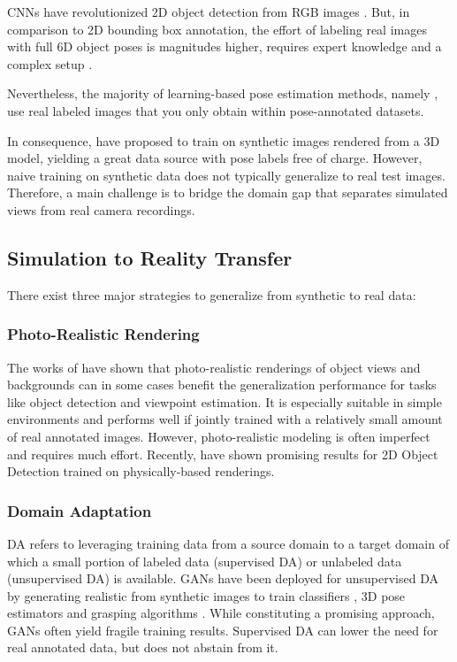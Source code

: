 \glspl{CNN} have revolutionized 2D object detection from RGB images \citep{ren2015faster,liu2016ssd,lin2018focal}. But, in comparison to 2D bounding box annotation, the effort of labeling real images with full 6D object poses is magnitudes higher, requires expert knowledge and a complex setup \citep{hodan2017tless}. 

Nevertheless, the majority of learning-based pose estimation methods, namely \cite{tekin2017real,wohlhart2015learning,brachmann2016uncertainty,rad2017bb8, xiang2017posecnn}, use real labeled images that you only obtain within pose-annotated datasets. 

In consequence, \cite{kehl2017ssd, wohlhart2015learning, tremblay2018deep, zakharov2019dpod} have proposed to train on synthetic images rendered from a 3D model, yielding a great data source with pose labels free of charge. However, naive training on synthetic data does not typically generalize to real test images. Therefore, a main challenge is to bridge the domain gap that separates simulated views from real camera recordings. 

\subsection{Simulation to Reality Transfer}

There exist three major strategies to generalize from synthetic to real data: 

\subsubsection{Photo-Realistic Rendering} The works of \cite{movshovitz2016useful,su2015render,mitash2017self,richter2016playing} have shown that photo-realistic renderings of object views
and backgrounds can in some cases benefit the generalization performance for tasks like object detection and viewpoint estimation. It is especially suitable in simple environments and performs well if jointly trained with a relatively small amount of real annotated images.  However, photo-realistic modeling is often imperfect and requires much effort. Recently, \cite{Hodan2019PhotorealisticIS} have shown promising results for 2D Object Detection trained on physically-based renderings.

\subsubsection{Domain Adaptation} \gls{DA} \citep{csurka2017domain} refers to leveraging training data from a source domain to a target domain of which a small portion of labeled data (supervised \gls{DA}) or unlabeled data (unsupervised \gls{DA}) is available. \glspl{GAN} have been deployed for unsupervised \gls{DA} by generating realistic from synthetic images to train classifiers \citep{shrivastava2017learning}, 3D pose estimators \citep{bousmalis2017unsupervised} and grasping algorithms \citep{bousmalis2017using}. While constituting a promising approach, \glspl{GAN} often yield fragile training results. 
Supervised \gls{DA} can lower the need for real annotated data, but does not abstain from it. 

